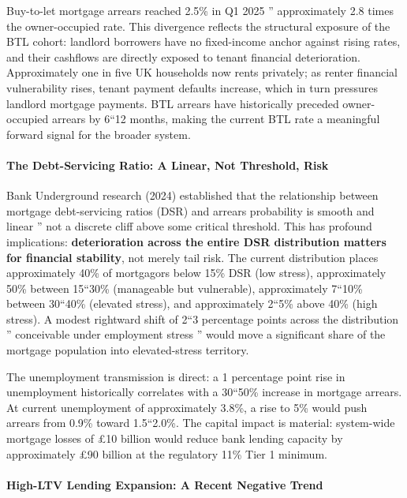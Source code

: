 \documentclass[
]{article}
\begin{document}
Buy-to-let mortgage arrears reached 2.5\% in Q1 2025 '' approximately
2.8 times the owner-occupied rate. This divergence reflects the
structural exposure of the BTL cohort: landlord borrowers have no
fixed-income anchor against rising rates, and their cashflows are
directly exposed to tenant financial deterioration. Approximately one in
five UK households now rents privately; as renter financial
vulnerability rises, tenant payment defaults increase, which in turn
pressures landlord mortgage payments. BTL arrears have historically
preceded owner-occupied arrears by 6``12 months, making the current BTL
rate a meaningful forward signal for the broader system.

\paragraph{The Debt-Servicing Ratio: A Linear, Not Threshold,
Risk}\label{the-debt-servicing-ratio-a-linear-not-threshold-risk}

Bank Underground research (2024) established that the relationship
between mortgage debt-servicing ratios (DSR) and arrears probability is
smooth and linear '' not a discrete cliff above some critical threshold.
This has profound implications: \textbf{deterioration across the entire
DSR distribution matters for financial stability}, not merely tail risk.
The current distribution places approximately 40\% of mortgagors below
15\% DSR (low stress), approximately 50\% between 15``30\% (manageable
but vulnerable), approximately 7``10\% between 30``40\% (elevated
stress), and approximately 2``5\% above 40\% (high stress). A modest
rightward shift of 2``3 percentage points across the distribution ''
conceivable under employment stress '' would move a significant share of
the mortgage population into elevated-stress territory.

The unemployment transmission is direct: a 1 percentage point rise in
unemployment historically correlates with a 30``50\% increase in
mortgage arrears. At current unemployment of approximately 3.8\%, a rise
to 5\% would push arrears from 0.9\% toward 1.5``2.0\%. The capital
impact is material: system-wide mortgage losses of £10 billion would
reduce bank lending capacity by approximately £90 billion at the
regulatory 11\% Tier 1 minimum.

\paragraph{High-LTV Lending Expansion: A Recent Negative
Trend}\label{high-ltv-lending-expansion-a-recent-negative-trend}
\end{document}
